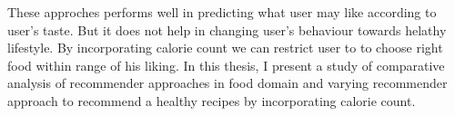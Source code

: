 These approches performs well in predicting what user may like according to user's taste. But it does not help in changing user's behaviour towards helathy lifestyle. By incorporating calorie count we can restrict user to to choose right food within range of his liking. In this thesis, I present a study of comparative analysis of recommender approaches in food domain and varying recommender approach to recommend a healthy recipes by incorporating calorie count.